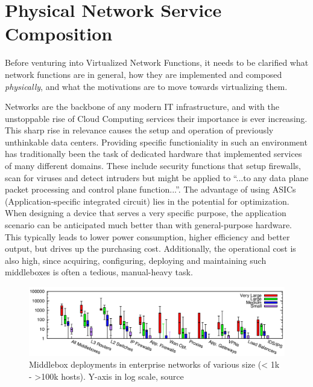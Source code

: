 \section{Physical Network Service Composition}
\label{sec:physical}
Before venturing into Virtualized Network Functions, it needs to be clarified what network functions are in general, how they are implemented and composed \textit{physically}, and what the motivations are to move towards virtualizing them. 

Networks are the backbone of any modern IT infrastructure, and with the unstoppable rise of  Cloud Computing services their importance is ever increasing. This sharp rise in relevance causes the setup and operation of previously unthinkable data centers. Providing specific functioniality in such an environment has traditionally been the task of dedicated hardware that implemented services of many different domains. These include security functions that setup firewalls, scan for viruses and detect intruders but might be applied to ``...to any data plane packet processing and control plane function...''\cite{nfv_wp}. The advantage of using ASICs (Application-specific integrated circuit) lies in the potential for optimization. When designing a device that serves a very specific purpose, the application scenario can be anticipated much better than with general-purpose hardware. This typically leads to lower power consumption, higher efficiency and better output, but drives up the purchasing cost. Additionally, the operational cost is also high, since acquiring, configuring, deploying and maintaining such middleboxes is often a tedious, manual-heavy task. 

\begin{figure}[H]
	\centering
	\includegraphics[width=1\linewidth]{images/middleboxesNumbers.png}
	\caption{Middlebox deployments in enterprise networks of various size (< 1k - >100k hosts). Y-axis in log scale, source \cite{sherry2016middleboxes}}
	\label{img:middleboxesNumbers}
\end{figure}

